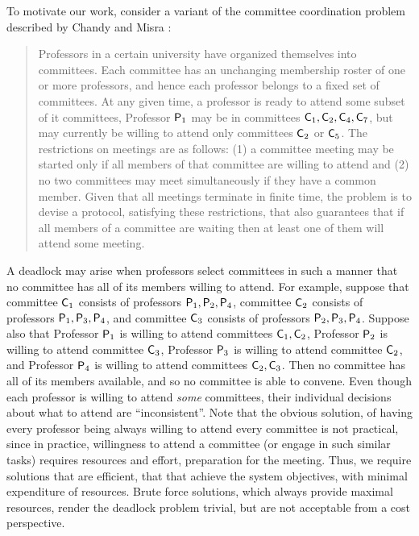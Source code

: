 To motivate our work, consider a variant of 
the committee coordination problem described by Chandy and Misra \cite{CM88}:
\begin{quote}
  Professors in a certain university have organized themselves into committees.  Each committee has an unchanging membership roster of one or more
  professors, and hence each professor belongs to a fixed set of committees.
At any given time, a professor is ready to attend some subset of it committees, \eg Professor $\mathsf{P}_1$ may be in committees $\mathsf{C}_1, \mathsf{C}_2, \mathsf{C}_4, \mathsf{C}_7$, but may
currently be willing to attend only committees $\mathsf{C}_2$ or $\mathsf{C}_5$.
The restrictions on meetings are as follows: (1) a committee meeting may be started only if all
  members of that committee are willing to attend and (2) no two committees may meet simultaneously if they have a common member.  Given that all meetings
  terminate in finite time, the problem is to devise a protocol, satisfying these restrictions, that also guarantees that if all members of a
  committee are waiting then at least one of them will attend some meeting.
\end{quote}
A deadlock may arise when professors select committees in such a manner that no committee has all of its members willing to attend.  
%
For example, suppose that 
committee $\mathsf{C}_1$ consists of professors $\mathsf{P}_1, \mathsf{P}_2, \mathsf{P}_4$, 
committee $\mathsf{C}_2$ consists of professors $\mathsf{P}_1, \mathsf{P}_3, \mathsf{P}_4$, and 
committee $\mathsf{C}_3$ consists of professors $\mathsf{P}_2, \mathsf{P}_3, \mathsf{P}_4$.
%
Suppose also that 
Professor $\mathsf{P}_1$ is willing to attend committees $\mathsf{C}_1, \mathsf{C}_2$, 
Professor $\mathsf{P}_2$ is willing to attend committee $\mathsf{C}_3$, %
Professor $\mathsf{P}_3$ is willing to attend committee $\mathsf{C}_2$, and %
Professor $\mathsf{P}_4$ is willing to attend committees $\mathsf{C}_2, \mathsf{C}_3$. %
%
Then no committee has all of its members available, and so no committee is able to convene. 
Even though each professor is willing to attend \emph{some} committees, their individual decisions about what to attend are 
``inconsistent''. 
Note that the obvious solution, of having every professor being always willing to attend every committee is not practical, since in practice,
willingness to attend a committee (or engage in such similar tasks) requires resources and effort, \eg preparation for the meeting. 
Thus, we require solutions that are efficient, that that achieve the system objectives, with minimal expenditure of resources. 
Brute force solutions, which always provide maximal resources, render the deadlock problem trivial, but are not acceptable from a cost perspective.



